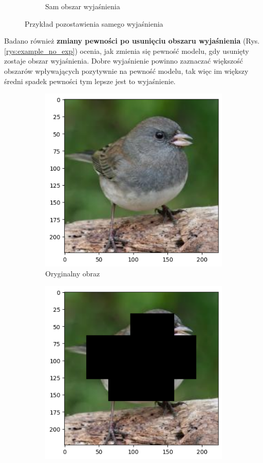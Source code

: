 \begin{figure}[h]
\begin{subfigure}[b]{0.45\textwidth}
		\caption{Sam obszar wyjaśnienia}
	\end{subfigure}
	\caption{Przykład pozostawienia samego wyjaśnienia}
	\label{rys:example_only_exp}
\end{figure}

Badano również \textbf{zmiany pewności po usunięciu obszaru wyjaśnienia} (Rys. \ref{rys:example_no_exp}) ocenia, jak zmienia się pewność modelu, gdy usunięty zostaje obszar wyjaśnienia.
Dobre wyjaśnienie powinno zaznaczać większość obszarów wpływających pozytywnie na pewność modelu, tak więc im większy średni spadek pewności tym lepsze jest to wyjaśnienie.

\begin{figure}[h]
	\begin{subfigure}[b]{0.45\textwidth}
		\centering\includegraphics[width=.9\textwidth]{img/parameters/quality/base}
		\caption{Oryginalny obraz}
	\end{subfigure}
	\begin{subfigure}[b]{0.45\textwidth}
		\centering\includegraphics[width=.9\textwidth]{img/parameters/quality/wo_mask}

\end{subfigure}
\end{figure}
